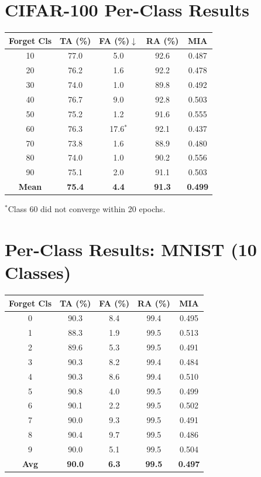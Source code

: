 \documentclass[letterpaper]{article}
\begin{document}
\section{CIFAR-100 Per-Class Results}

\begin{center}
\small
\begin{tabular}{ccccc}
\toprule
Forget Cls & TA (\%) & FA (\%)$\downarrow$ & RA (\%) & MIA \\
\midrule
10 & 77.0 & 5.0 & 92.6 & 0.487 \\
20 & 76.2 & 1.6 & 92.2 & 0.478 \\
30 & 74.0 & 1.0 & 89.8 & 0.492 \\
40 & 76.7 & 9.0 & 92.8 & 0.503 \\
50 & 75.2 & 1.2 & 91.6 & 0.555 \\
60 & 76.3 & 17.6$^*$ & 92.1 & 0.437 \\
70 & 73.8 & 1.6 & 88.9 & 0.480 \\
80 & 74.0 & 1.0 & 90.2 & 0.556 \\
90 & 75.1 & 2.0 & 91.1 & 0.503 \\
\midrule
\textbf{Mean} & \textbf{75.4} & \textbf{4.4} & \textbf{91.3} & \textbf{0.499} \\
\bottomrule
\end{tabular}
\end{center}

{\small $^*$Class 60 did not converge within 20 epochs.}

\section{Per-Class Results: MNIST (10 Classes)}

\begin{center}
\small
\begin{tabular}{ccccc}
\toprule
Forget Cls & TA (\%) & FA (\%) & RA (\%) & MIA \\
\midrule
0 & 90.3 & 8.4 & 99.4 & 0.495 \\
1 & 88.3 & 1.9 & 99.5 & 0.513 \\
2 & 89.6 & 5.3 & 99.5 & 0.491 \\
3 & 90.3 & 8.2 & 99.4 & 0.484 \\
4 & 90.3 & 8.6 & 99.4 & 0.510 \\
5 & 90.8 & 4.0 & 99.5 & 0.499 \\
6 & 90.1 & 2.2 & 99.5 & 0.502 \\
7 & 90.0 & 9.3 & 99.5 & 0.491 \\
8 & 90.4 & 9.7 & 99.5 & 0.486 \\
9 & 90.0 & 5.1 & 99.5 & 0.504 \\
\midrule
\textbf{Avg} & \textbf{90.0} & \textbf{6.3} & \textbf{99.5} & \textbf{0.497} \\
\bottomrule
\end{tabular}
\end{center}
\end{document}
